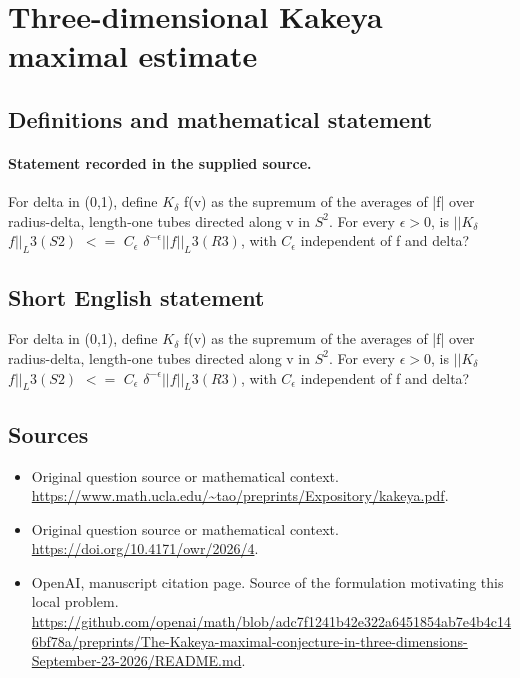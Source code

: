 \documentclass[11pt]{article}
\begin{document}
\section*{Three-dimensional Kakeya maximal estimate}\label{30007430}
\subsection{Definitions and mathematical statement}
\paragraph{Statement recorded in the supplied source.}
For delta in (0,1), define $K_\delta $ f(v) as the supremum of the averages of |f| over radius-delta, length-one tubes directed along v in $S^2$. For every $\epsilon >0$, is $||K_\delta $ $f||_L3(S2)$ $<=$ $C_\epsilon $ $\delta ^{-\epsilon }||f||_L3(R3)$, with $C_\epsilon $ independent of f and delta?
\subsection{Short English statement}
For delta in (0,1), define $K_\delta $ f(v) as the supremum of the averages of |f| over radius-delta, length-one tubes directed along v in $S^2$. For every $\epsilon >0$, is $||K_\delta $ $f||_L3(S2)$ $<=$ $C_\epsilon $ $\delta ^{-\epsilon }||f||_L3(R3)$, with $C_\epsilon $ independent of f and delta?
\subsection{Sources}
\begin{itemize}
\item[S1] Original question source or mathematical context.
\url{https://www.math.ucla.edu/~tao/preprints/Expository/kakeya.pdf}.
\item[S2] Original question source or mathematical context.
\url{https://doi.org/10.4171/owr/2026/4}.
\item[S3] OpenAI, manuscript citation page. Source of the formulation motivating this local problem.
\url{https://github.com/openai/math/blob/adc7f1241b42e322a6451854ab7e4b4c146bf78a/preprints/The-Kakeya-maximal-conjecture-in-three-dimensions-September-23-2026/README.md}.
\end{itemize}
\end{document}

